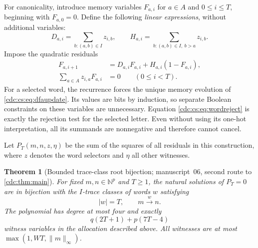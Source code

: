 \documentclass[11pt,a4paper]{article}
\newtheorem{theorem}{Theorem}[section]
\theoremstyle{definition}
\theoremstyle{remark}
\newcommand{\N}{\mathbb N}
\newcommand{\norm}[1]{\lVert #1\rVert_\infty}
\begin{document}
For canonicality, introduce memory variables $F_{a,i}$ for
$a\in A$ and $0\leq i\leq T$, beginning with $F_{a,0}=0$. Define the following
\emph{linear expressions}, without additional variables:
\[
D_{a,i}=\sum_{b:(a,b)\in I}z_{i,b},\qquad
H_{a,i}=\sum_{b:(a,b)\in I,\ b>a}z_{i,b}.
\]
Impose the quadratic residuals
\begin{align}
\label{cdc:cs:eq:wordmemory}
F_{a,i+1}&=D_{a,i}F_{a,i}+H_{a,i}(1-F_{a,i}),\\
\label{cdc:cs:eq:wordreject}
\sum_{a\in A} z_{i,a}F_{a,i}&=0\qquad(0\leq i<T).
\end{align}
For a selected word, the recurrence forces the unique memory evolution of
\eqref{cdc:cs:eq:dfaupdate}. Its values are bits by induction, so separate Boolean
constraints on these variables are unnecessary. Equation
\eqref{cdc:cs:eq:wordreject} is exactly the rejection test for the selected letter.
Even without using its one-hot interpretation, all its summands are
nonnegative and therefore cannot cancel.

Let $P_T(m,n,z,\eta)$ be the sum of the squares of all residuals in this
construction, where $z$ denotes the word selectors and $\eta$ all other
witnesses.

\begin{theorem}[Bounded trace-class root bijection; manuscript~06, second route to \cref{cdc:thm:main}]
\label{cdc:cs:thm:tracebijection}
For fixed $m,n\in\N^p$ and $T\geq1$, the natural solutions of $P_T=0$ are in
bijection with the $I$-trace classes of words $w$ satisfying
\[
|w|=T,\qquad m\xrightarrow{w}n.
\]
The polynomial has degree at most four and exactly
\begin{equation}
\label{cdc:cs:eq:tracecount}
q(2T+1)+p(7T-4)
\end{equation}
witness variables in the allocation described above. All witnesses are at
most $\max(1,WT,\norm m)$.
\end{theorem}
\end{document}
